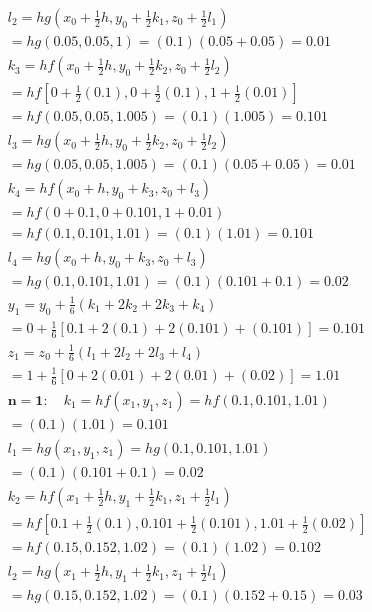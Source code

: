 \documentclass[10pt]{article}
\begin{document}
$$
\begin{aligned}
& l_{2}=h g\left(x_{0}+\frac{1}{2} h, y_{0}+\frac{1}{2} k_{1}, z_{0}+\frac{1}{2} l_{1}\right) \\
& =h g(0.05,0.05,1)=(0.1)(0.05+0.05)=0.01 \\
& k_{3}=h f\left(x_{0}+\frac{1}{2} h, y_{0}+\frac{1}{2} k_{2}, z_{0}+\frac{1}{2} l_{2}\right) \\
& =h f\left[0+\frac{1}{2}(0.1), 0+\frac{1}{2}(0.1), 1+\frac{1}{2}(0.01)\right] \\
& =h f(0.05,0.05,1.005)=(0.1)(1.005)=0.101 \\
& l_{3}=h g\left(x_{0}+\frac{1}{2} h, y_{0}+\frac{1}{2} k_{2}, z_{0}+\frac{1}{2} l_{2}\right) \\
& =h g(0.05,0.05,1.005)=(0.1)(0.05+0.05)=0.01 \\
& k_{4}=h f\left(x_{0}+h, y_{0}+k_{3}, z_{0}+l_{3}\right) \\
& =h f(0+0.1,0+0.101,1+0.01) \\
& =h f(0.1,0.101,1.01)=(0.1)(1.01)=0.101 \\
& l_{4}=h g\left(x_{0}+h, y_{0}+k_{3}, z_{0}+l_{3}\right) \\
& =h g(0.1,0.101,1.01)=(0.1)(0.101+0.1)=0.02 \\
& y_{1}=y_{0}+\frac{1}{6}\left(k_{1}+2 k_{2}+2 k_{3}+k_{4}\right) \\
& =0+\frac{1}{6}[0.1+2(0.1)+2(0.101)+(0.101)]=0.101 \\
& z_{1}=z_{0}+\frac{1}{6}\left(l_{1}+2 l_{2}+2 l_{3}+l_{4}\right) \\
& =1+\frac{1}{6}[0+2(0.01)+2(0.01)+(0.02)]=1.01 \\
& \boldsymbol{n}=\mathbf{1}: \quad k_{1}=h f\left(x_{1}, y_{1}, z_{1}\right)=h f(0.1,0.101,1.01) \\
& =(0.1)(1.01)=0.101 \\
& l_{1}=h g\left(x_{1}, y_{1}, z_{1}\right)=h g(0.1,0.101,1.01) \\
& =(0.1)(0.101+0.1)=0.02 \\
& k_{2}=h f\left(x_{1}+\frac{1}{2} h, y_{1}+\frac{1}{2} k_{1}, z_{1}+\frac{1}{2} l_{1}\right) \\
& =h f\left[0.1+\frac{1}{2}(0.1), 0.101+\frac{1}{2}(0.101), 1.01+\frac{1}{2}(0.02)\right] \\
& =h f(0.15,0.152,1.02)=(0.1)(1.02)=0.102 \\
& l_{2}=h g\left(x_{1}+\frac{1}{2} h, y_{1}+\frac{1}{2} k_{1}, z_{1}+\frac{1}{2} l_{1}\right) \\
& =h g(0.15,0.152,1.02)=(0.1)(0.152+0.15)=0.03 \\

\end{aligned}$$
\end{document}
